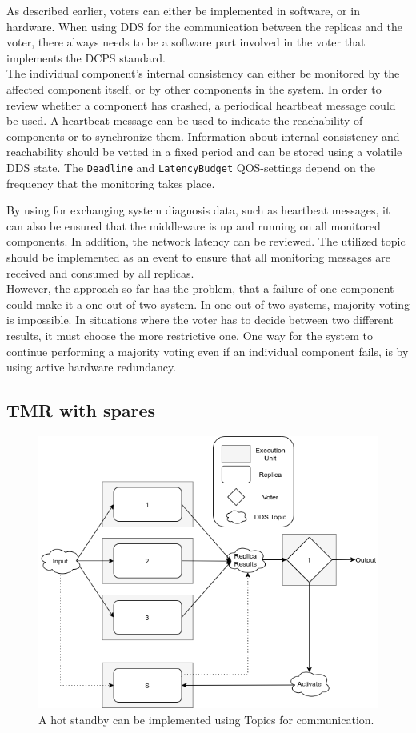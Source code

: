 As described earlier, voters can either be implemented in software, or in hardware.
When using \gls*{DDS} for the communication between the replicas and the voter, there always needs to be a software part involved in the voter that implements the \gls*{DCPS} standard.
\\

The individual component's internal consistency can either be monitored by the affected component itself, or by other components in the system.
In order to review whether a component has crashed, a periodical heartbeat message could be used.
A heartbeat message can be used to indicate the reachability of components or to synchronize them.
Information about internal consistency and reachability should be vetted in a fixed period and can be stored using a volatile \gls*{DDS} state.
The \texttt{Deadline} and \texttt{LatencyBudget} \gls*{QOS}-settings depend on the frequency that the monitoring takes place.

By using  for exchanging system diagnosis data, such as heartbeat messages, it can also be ensured that the  middleware is up and running on all monitored components.
In addition, the network latency can be reviewed.
The utilized topic should be implemented as an event to ensure that all monitoring messages are received and consumed by all replicas.
\\

However, the  approach so far has the problem, that a failure of one component could make it a one-out-of-two system.
In one-out-of-two systems, majority voting is impossible.
In situations where the voter has to decide between two different results, it must choose the more restrictive one.
One way for the system to continue performing a majority voting even if an individual component fails, is by using active hardware redundancy.

\subsection{\Gls*{TMR} with spares}
\begin{figure}[!hb]
	\centering
	\includegraphics[width=0.75\linewidth]{images/TMRWithSparesDDS}
	\caption{A hot standby can be implemented using  Topics for communication.}
	\label{fig:TMRWithSparesDDS}
\end{figure}

